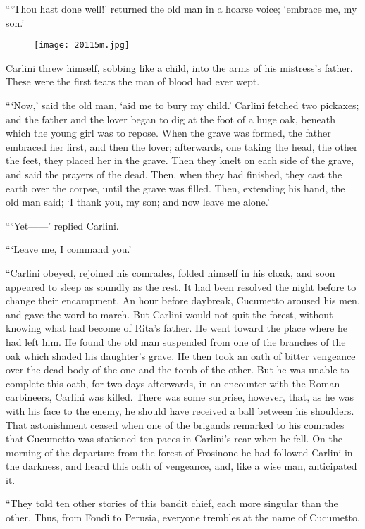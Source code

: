 “‘Thou hast done well!’ returned the old man in a hoarse voice;
‘embrace me, my son.’

\begin{figure}[ht]
\texttt{[image: 20115m.jpg]}
\end{figure}

Carlini threw himself, sobbing like a child, into the arms of his
mistress’s father. These were the first tears the man of blood had ever
wept.

“‘Now,’ said the old man, ‘aid me to bury my child.’ Carlini fetched
two pickaxes; and the father and the lover began to dig at the foot of
a huge oak, beneath which the young girl was to repose. When the grave
was formed, the father embraced her first, and then the lover;
afterwards, one taking the head, the other the feet, they placed her in
the grave. Then they knelt on each side of the grave, and said the
prayers of the dead. Then, when they had finished, they cast the earth
over the corpse, until the grave was filled. Then, extending his hand,
the old man said; ‘I thank you, my son; and now leave me alone.’

“‘Yet——’ replied Carlini.

“‘Leave me, I command you.’

“Carlini obeyed, rejoined his comrades, folded himself in his cloak,
and soon appeared to sleep as soundly as the rest. It had been resolved
the night before to change their encampment. An hour before daybreak,
Cucumetto aroused his men, and gave the word to march. But Carlini
would not quit the forest, without knowing what had become of Rita’s
father. He went toward the place where he had left him. He found the
old man suspended from one of the branches of the oak which shaded his
daughter’s grave. He then took an oath of bitter vengeance over the
dead body of the one and the tomb of the other. But he was unable to
complete this oath, for two days afterwards, in an encounter with the
Roman carbineers, Carlini was killed. There was some surprise, however,
that, as he was with his face to the enemy, he should have received a
ball between his shoulders. That astonishment ceased when one of the
brigands remarked to his comrades that Cucumetto was stationed ten
paces in Carlini’s rear when he fell. On the morning of the departure
from the forest of Frosinone he had followed Carlini in the darkness,
and heard this oath of vengeance, and, like a wise man, anticipated it.

“They told ten other stories of this bandit chief, each more singular
than the other. Thus, from Fondi to Perusia, everyone trembles at the
name of Cucumetto.

